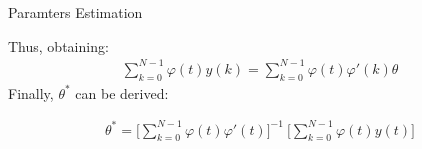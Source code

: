 \documentclass[aspectratio=169,hyperref={pdfpagelabels=false}]{beamer}
\begin{document}
\begin{frame}{Paramters Estimation}
  \begin{block}{}
    Thus, obtaining: 
\begin{align*}
  \sum_{k=0}^{N-1}\varphi(t)y(k) = \sum_{k=0}^{N-1}\varphi(t)\varphi'(k)\theta
\end{align*}
Finally, $\theta^*$ can be derived: 
\begin{center}
\begin{tcolorbox}[width=0.6\linewidth, height = 0.22\linewidth, colframe=red]
    \begin{align*}
      \theta^* = \Biggr[\sum_{k=0}^{N-1}\varphi(t)\varphi'(t)\Biggr]^{-1} \: \Biggr[\sum_{k=0}^{N-1}\varphi(t)y(t)\Biggr]
    \end{align*}
\end{tcolorbox}
\end{center}
\end{block}
\end{frame}
\end{document}
